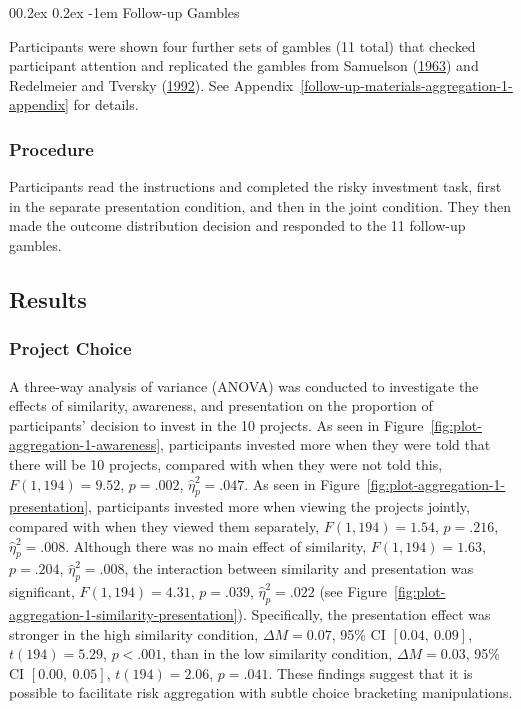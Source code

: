 \documentclass[
  english,
  man, donotrepeattitle,floatsintext]{apa7}
\makeatletter
\let\oldparagraph\paragraph
\renewcommand{\paragraph}[1]{\oldparagraph{#1}\mbox{}}
\renewcommand{\paragraph}{\@startsection{paragraph}{4}{\parindent}%
  {0\baselineskip \@plus 0.2ex \@minus 0.2ex}%
  {-1em}%
  {\normalfont\normalsize\bfseries\itshape\typesectitle}}
\theoremstyle{definition}
\theoremstyle{definition}
\theoremstyle{definition}
\theoremstyle{definition}
\theoremstyle{remark}
\makeatother
\begin{document}
\hypertarget{follow-up-gambles}{%
\paragraph{Follow-up Gambles}\label{follow-up-gambles}}

Participants were shown four further sets of gambles (11 total) that checked
participant attention and replicated the gambles from Samuelson (\protect\hyperlink{ref-samuelson1963}{1963}) and
Redelmeier and Tversky (\protect\hyperlink{ref-redelmeier1992}{1992}). See Appendix~\ref{follow-up-materials-aggregation-1-appendix}
for details.

\hypertarget{procedure}{%
\subsubsection{Procedure}\label{procedure}}

Participants read the instructions and completed the risky investment task,
first in the separate presentation condition, and then in the joint condition.
They then made the outcome distribution decision and responded to the 11
follow-up gambles.

\hypertarget{results-aggregation-1}{%
\subsection{Results}\label{results-aggregation-1}}

\hypertarget{project-choice}{%
\subsubsection{Project Choice}\label{project-choice}}

A three-way analysis of variance (ANOVA) was conducted to investigate the
effects of similarity, awareness, and presentation on the proportion of
participants' decision to invest in the 10 projects. As seen in
Figure~\ref{fig:plot-aggregation-1-awareness}, participants invested more when
they were told that there will be 10 projects, compared with when they were not
told this, \(F(1, 194) = 9.52\), \(p = .002\), \(\hat{\eta}^2_p = .047\). As seen in
Figure~\ref{fig:plot-aggregation-1-presentation}, participants invested more
when viewing the projects jointly, compared with when they viewed them separately,
\(F(1, 194) = 1.54\), \(p = .216\), \(\hat{\eta}^2_p = .008\). Although there was no main effect of
similarity, \(F(1, 194) = 1.63\), \(p = .204\), \(\hat{\eta}^2_p = .008\), the interaction between
similarity and presentation was significant,
\(F(1, 194) = 4.31\), \(p = .039\), \(\hat{\eta}^2_p = .022\) (see
Figure~\ref{fig:plot-aggregation-1-similarity-presentation}). Specifically, the
presentation effect was stronger in the high similarity condition,
\(\Delta M = 0.07\), 95\% CI \([0.04,~0.09]\), \(t(194) = 5.29\), \(p < .001\), than in the low similarity
condition, \(\Delta M = 0.03\), 95\% CI \([0.00,~0.05]\), \(t(194) = 2.06\), \(p = .041\). These findings
suggest that it is possible to facilitate risk aggregation with subtle choice
bracketing manipulations.
\end{document}
